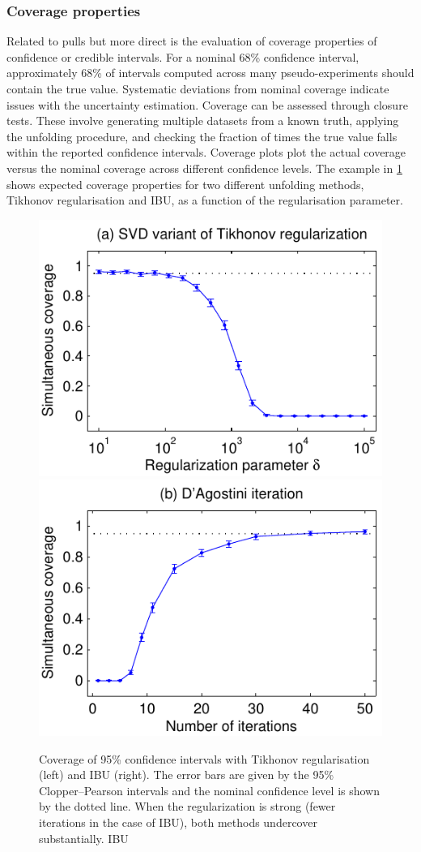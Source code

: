         \subsubsection{Coverage properties}
            Related to pulls but more direct is the evaluation of coverage properties of confidence or credible intervals.
            For a nominal 68\% confidence interval, approximately 68\% of intervals computed across many pseudo-experiments should contain the true value.
            Systematic deviations from nominal coverage indicate issues with the uncertainty estimation.
            Coverage can be assessed through closure tests. These involve generating multiple datasets from a known truth, applying the unfolding procedure, and checking the fraction of times the true value falls within the reported confidence intervals.
            Coverage plots plot the actual coverage versus the nominal coverage across different confidence levels.
            The example in \cref{fig:coverage} shows expected coverage properties for two different unfolding methods, Tikhonov regularisation and IBU, as a function of the regularisation parameter.
            \begin{figure}
                \centering
                \includegraphics[width=0.5\linewidth]{figures/chapter-02/incJets_lumFactor150nBinsE30nBinsF30JointCoverageSVD.pdf}\includegraphics[width=0.5\linewidth]{figures/chapter-02/incJets_lumFactor150nBinsE30nBinsF30JointCoverageDAgostini.pdf}
                \caption[Coverage properties of Tikhonov regularisation and IBU]{Coverage of 95\% confidence intervals with Tikhonov regularisation (left) and IBU (right).
                The error bars are given by the 95\% Clopper–Pearson intervals and the nominal confidence level is shown by the dotted line.
                When the regularization is strong (fewer iterations in the case of IBU), both methods undercover substantially. IBU~\cite{kuusela_shape-constrained_2017}}
                \label{fig:coverage}
            \end{figure}
